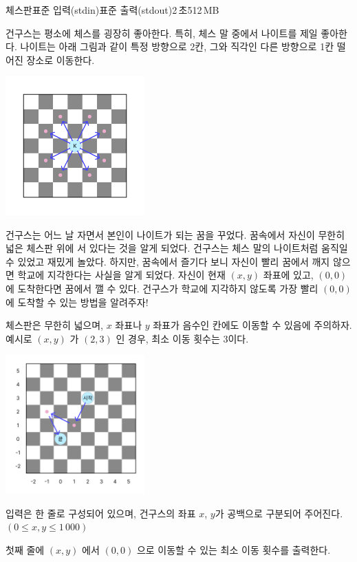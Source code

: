 \begin{problem}{체스판}{표준 입력(stdin)}{표준 출력(stdout)}{2\,초}{512\,MB}

건구스는 평소에 체스를 굉장히 좋아한다. 특히, 체스 말 중에서 나이트를 제일 좋아한다. 나이트는 아래 그림과 같이 특정 방향으로 2칸, 그와 직각인 다른 방향으로 1칸 떨어진 장소로 이동한다.

\begin{center}
  \includegraphics[width=0.4\textwidth]{../pictures/image1.png} \\
\end{center}

건구스는 어느 날 자면서 본인이 나이트가 되는 꿈을 꾸었다. 꿈속에서 자신이 무한히 넓은 체스판 위에 서 있다는 것을 알게 되었다. 건구스는 체스 말의 나이트처럼 움직일 수 있었고 재밌게 놀았다.
하지만, 꿈속에서 즐기다 보니 자신이 빨리 꿈에서 깨지 않으면 학교에 지각한다는 사실을 알게 되었다. 자신이 현재 $(x, y)$ 좌표에 있고, $(0, 0)$ 에 도착한다면 꿈에서 깰 수 있다.
건구스가 학교에 지각하지 않도록 가장 빨리 $(0, 0)$ 에 도착할 수 있는 방법을 알려주자!

체스판은 무한히 넓으며, $x$ 좌표나 $y$ 좌표가 음수인 칸에도 이동할 수 있음에 주의하자.
예시로 $(x, y)$ 가 $(2, 3)$ 인 경우, 최소 이동 횟수는 3이다.

\begin{center}
  \includegraphics[width=0.4\textwidth]{../pictures/image2.png} \\
\end{center}

\InputFile
입력은 한 줄로 구성되어 있으며, 건구스의 좌표 $x$, $y$가 공백으로 구분되어 주어진다. $(0 \le x, y \le 1\,000)$

\OutputFile
첫째 줄에 $(x, y)$ 에서 $(0, 0)$ 으로 이동할 수 있는 최소 이동 횟수를 출력한다.

\Examples

\begin{example}
%
%
%
%
\end{example}

\end{problem}
